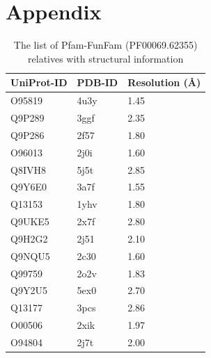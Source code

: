 \documentclass[a4paper, 11pt]{report}
\begin{document}
\section{Appendix}
\begin{table}[H]
\centering
\caption{The list of Pfam-FunFam (PF00069.62355) relatives with structural information}
\label{pfam-62355}
\begin{tabular}{|l|l|l|}
\hline
UniProt-ID & PDB-ID & Resolution (Å) \\ \hline
O95819     & 4u3y   & 1.45           \\ \hline
Q9P289     & 3ggf   & 2.35           \\ \hline
Q9P286     & 2f57   & 1.80           \\ \hline
O96013     & 2j0i   & 1.60           \\ \hline
Q8IVH8     & 5j5t   & 2.85           \\ \hline
Q9Y6E0     & 3a7f   & 1.55           \\ \hline
Q13153     & 1yhv   & 1.80           \\ \hline
Q9UKE5     & 2x7f   & 2.80           \\ \hline
Q9H2G2     & 2j51   & 2.10           \\ \hline
Q9NQU5     & 2c30   & 1.60           \\ \hline
Q99759     & 2o2v   & 1.83           \\ \hline
Q9Y2U5     & 5ex0   & 2.70           \\ \hline
Q13177     & 3pcs   & 2.86           \\ \hline
O00506     & 2xik   & 1.97           \\ \hline
O94804     & 2j7t   & 2.00           \\ \hline
\end{tabular}

\end{table}
\end{document}
